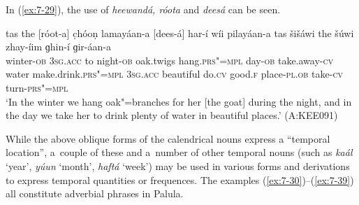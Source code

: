 In (\ref{ex:7-29}), the use of \textit{heewandá, róota} and \textit{deesá} can be seen.

\begin{exe}
\ex
\label{ex:7-29}
\gll [heewand-á] tas the [róot-a] c̣hóoṇ  lamayáan-a [dees-á] har-í wíi
pilayáan-a tas šišáwi the šúwi zhay-íim ɡhin-í ɡir-áan-a \\
winter-\textsc{ob } \textsc{3sg.acc} to night-\textsc{ob} oak.twigs  hang.\textsc{prs"=mpl} day-\textsc{ob} take.away-\textsc{cv} water make.drink.\textsc{prs"=mpl} \textsc{3sg.acc}  beautiful do.\textsc{cv} good.\textsc{f} place-\textsc{pl.ob} take-\textsc{cv} turn-\textsc{prs"=mpl} \\
\glt `In the winter we hang oak"=branches for her [the goat] during the night, and in the day we take her to drink plenty of water in beautiful places.' (A:KEE091)
\end{exe}

While the above oblique forms of the calendrical nouns express a ``temporal location'', a~couple of these and a~number of other temporal nouns (such as \textit{kaál} `year', \textit{yúun} `month', \textit{haftá} `week') may be used in various forms and derivations to express temporal quantities or frequences. The examples (\ref{ex:7-30})--(\ref{ex:7-39}) all constitute adverbial phrases in Palula.

